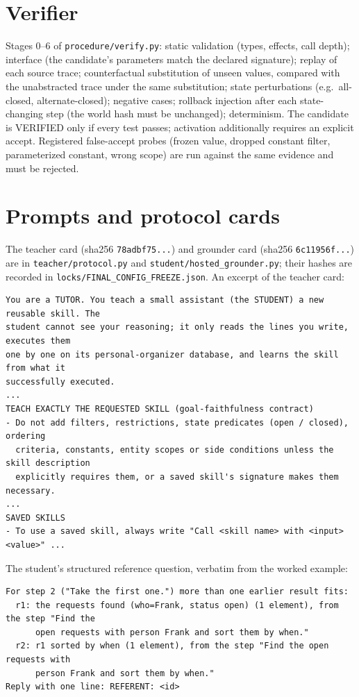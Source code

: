 \documentclass[10pt]{article}
\newcommand{\id}[1]{\nolinkurl{#1}}
\begin{document}
\section{Verifier}\label{app:verifier}
Stages 0--6 of \id{procedure/verify.py}: static validation (types, effects, call depth); interface (the candidate's parameters match the declared signature); replay of each source trace; counterfactual substitution of unseen values, compared with the unabstracted trace under the same substitution; state perturbations (e.g.\ all-closed, alternate-closed); negative cases; rollback injection after each state-changing step (the world hash must be unchanged); determinism. The candidate is VERIFIED only if every test passes; activation additionally requires an explicit accept. Registered false-accept probes (frozen value, dropped constant filter, parameterized constant, wrong scope) are run against the same evidence and must be rejected.

\section{Prompts and protocol cards}\label{app:prompts}
The teacher card (sha256 \id{78adbf75...}) and grounder card (sha256 \id{6c11956f...}) are in \id{teacher/protocol.py} and \id{student/hosted_grounder.py}; their hashes are recorded in \id{locks/FINAL_CONFIG_FREEZE.json}. An excerpt of the teacher card:
\begin{Verbatim}
You are a TUTOR. You teach a small assistant (the STUDENT) a new reusable skill. The
student cannot see your reasoning; it only reads the lines you write, executes them
one by one on its personal-organizer database, and learns the skill from what it
successfully executed.
...
TEACH EXACTLY THE REQUESTED SKILL (goal-faithfulness contract)
- Do not add filters, restrictions, state predicates (open / closed), ordering
  criteria, constants, entity scopes or side conditions unless the skill description
  explicitly requires them, or a saved skill's signature makes them necessary.
...
SAVED SKILLS
- To use a saved skill, always write "Call <skill name> with <input> <value>" ...
\end{Verbatim}
The student's structured reference question, verbatim from the worked example:
\begin{Verbatim}
For step 2 ("Take the first one.") more than one earlier result fits:
  r1: the requests found (who=Frank, status open) (1 element), from the step "Find the
      open requests with person Frank and sort them by when."
  r2: r1 sorted by when (1 element), from the step "Find the open requests with
      person Frank and sort them by when."
Reply with one line: REFERENT: <id>
\end{Verbatim}
\end{document}
